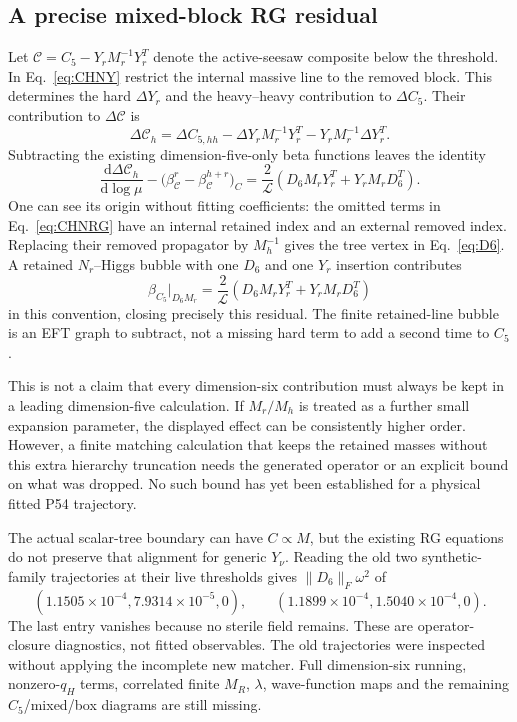 \documentclass[11pt]{article}
\newcommand{\dd}{\mathrm d}
\newcommand{\LOOP}{\mathcal L}
\begin{document}
\subsection{A precise mixed-block RG residual}
Let $\mathcal C=C_5-Y_rM_r^{-1}Y_r^T$ denote the active-seesaw composite
below the threshold. In Eq.~\eqref{eq:CHNY} restrict the internal massive
line to the removed block. This determines the hard $\Delta Y_r$ and
the heavy--heavy contribution to $\Delta C_5$. Their contribution to
$\Delta\mathcal C$ is
\begin{equation}
 \Delta\mathcal C_h=\Delta C_{5,hh}
 -\Delta Y_rM_r^{-1}Y_r^T-Y_rM_r^{-1}\Delta Y_r^T.
\end{equation}
Subtracting the existing dimension-five-only beta functions leaves the
identity
\begin{equation}
 \frac{\dd\Delta\mathcal C_h}{\dd\log\mu}
 -\big(\beta_{\mathcal C}^{r}-\beta_{\mathcal C}^{h+r}\big)_{C}
 =\frac2{\LOOP}\left(D_6M_rY_r^T+Y_rM_rD_6^T\right).
 \label{eq:D6mix}
\end{equation}
One can see its origin without fitting coefficients: the omitted terms
in Eq.~\eqref{eq:CHNRG} have an internal retained index and an external
removed index. Replacing their removed propagator by $M_h^{-1}$ gives
the tree vertex in Eq.~\eqref{eq:D6}. A retained $N_r$--Higgs bubble with
one $D_6$ and one $Y_r$ insertion contributes
\begin{equation}
 \beta_{C_5}\big|_{D_6 M_r}=
 \frac2{\LOOP}(D_6M_rY_r^T+Y_rM_rD_6^T)
\end{equation}
in this convention, closing precisely this residual. The finite
retained-line bubble is an EFT graph to subtract, not a missing hard
term to add a second time to $C_5$.

This is not a claim that every dimension-six contribution must always be
kept in a leading dimension-five calculation. If $M_r/M_h$ is treated
as a further small expansion parameter, the displayed effect can be
consistently higher order. However, a finite matching calculation that
keeps the retained masses without this extra hierarchy truncation needs
the generated operator or an explicit bound on what was dropped. No such
bound has yet been established for a physical fitted P54 trajectory.

The actual scalar-tree boundary can have $C\propto M$, but the existing
RG equations do not preserve that alignment for generic $Y_\nu$.
Reading the old two synthetic-family trajectories at their live thresholds
gives $\|D_6\|_F\omega^2$ of
\begin{equation}
 (1.1505\times10^{-4},7.9314\times10^{-5},0),\qquad
 (1.1899\times10^{-4},1.5040\times10^{-4},0).
\end{equation}
The last entry vanishes because no sterile field remains. These are
operator-closure diagnostics, not fitted observables. The old trajectories
were inspected without applying the incomplete new matcher. Full
dimension-six running, nonzero-$q_H$ terms, correlated finite $M_R$,
$\lambda$, wave-function maps and the remaining $C_5$/mixed/box diagrams
are still missing.
\end{document}
